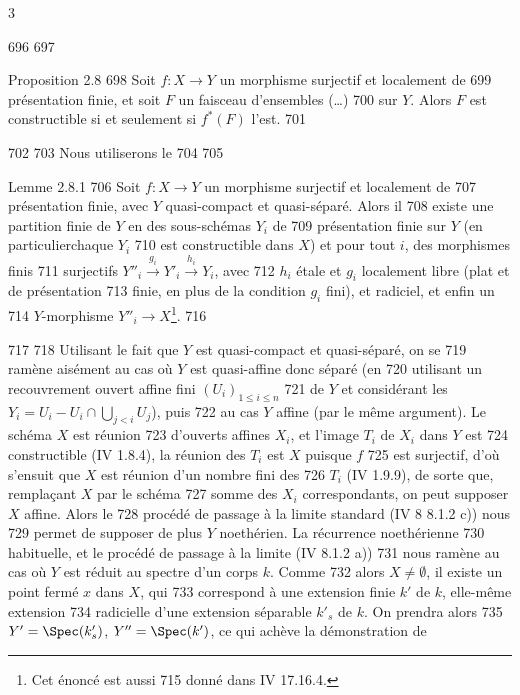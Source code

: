 3	\documentclass[10pt]{../fichiers-configuration-latex/smfart}
\begin{document}
   696	
   697	\begin{enonce*}{Proposition 2.8}
   698	Soit $f:X\rightarrow Y$ un morphisme surjectif et localement de
   699	présentation finie, et soit $F$ un faisceau d'ensembles (\resp\ldots)
   700	sur $Y$. Alors $F$ est constructible si et seulement si $f^{\ast}(F)$ l'est.
   701	\end{enonce*}
   702	
   703	Nous utiliserons le
   704	
   705	\begin{enonce*}{Lemme 2.8.1}
   706	Soit $f:X\rightarrow Y$ un morphisme surjectif et localement de
   707	présentation finie, avec $Y$ quasi-compact et quasi-séparé. Alors il
   708	existe une partition finie de $Y$ en des sous-schémas $Y_i$ de
   709	présentation finie sur $Y$ (en particulier\pageoriginale chaque $Y_i$
   710	est constructible dans $X$) et pour tout $i$, des morphismes finis
   711	surjectifs $Y''_i\xrightarrow{g_i}Y'_i\xrightarrow{h_i}Y_i$, avec
   712	$h_i$ étale et $g_i$ localement libre (\ie plat et de présentation
   713	finie, en plus de la condition $g_i$ fini), et radiciel, et enfin un
   714	$Y$-morphisme $Y''_i\rightarrow X$\footnote[1]{Cet énoncé est aussi
   715	  donné dans \EGA IV 17.16.4.}.
   716	\end{enonce*}
   717	
   718	Utilisant le fait que $Y$ est quasi-compact et quasi-séparé, on se
   719	ramène aisément au cas où $Y$ est quasi-affine donc séparé (en
   720	utilisant un recouvrement ouvert affine fini $(U_i)_{1\leq i\leq n}$
   721	de $Y$ et considérant les $Y_i=U_i-U_i\cap \bigcup_{j< i} U_j$), puis
   722	au cas $Y$ affine (par le même argument). Le schéma $X$ est réunion
   723	d'ouverts affines $X_i$, et l'image $T_i$ de $X_i$ dans $Y$ est
   724	constructible (\EGA IV 1.8.4), la réunion des $T_i$ est $X$ puisque $f$
   725	est surjectif, d'où s'ensuit que $X$ est réunion d'un nombre fini des
   726	$T_i$ (\EGA IV 1.9.9), de sorte que, remplaçant $X$ par le schéma
   727	somme des $X_i$ correspondants, on peut supposer $X$ affine. Alors le
   728	procédé de passage à la limite standard (\EGA IV 8 8.1.2 c)) nous
   729	permet de supposer de plus $Y$ noethérien. La récurrence noethérienne
   730	habituelle, et le procédé de passage à la limite (\EGA IV 8.1.2 a))
   731	nous ramène au cas où $Y$ est réduit au spectre d'un corps $k$. Comme
   732	alors $X\neq ∅$, il existe un point fermé $x$ dans $X$, qui
   733	correspond à une extension finie $k'$ de $k$, elle-même extension
   734	radicielle d'une extension séparable $k'_s$ de $k$. On prendra alors
   735	$Y'=\Spec(k'_s)$, $Y''=\Spec(k')$, ce qui achève la démonstration de
\end{document}
